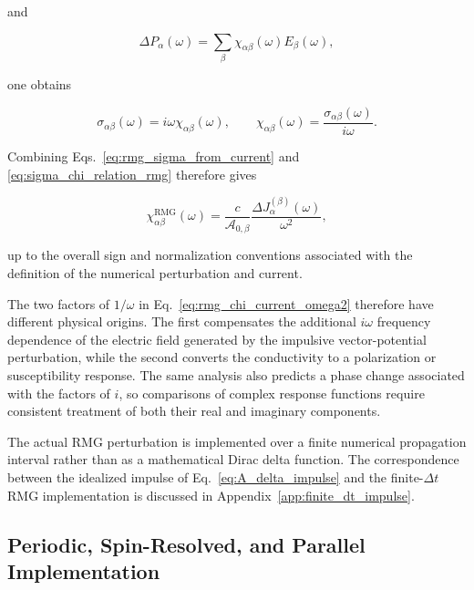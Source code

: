 and

\begin{equation}
\Delta P_{\alpha}(\omega)
=
\sum_{\beta}
\chi_{\alpha\beta}(\omega)
E_{\beta}(\omega),
\end{equation}

one obtains

\begin{equation}
\sigma_{\alpha\beta}(\omega)
=
i\omega
\chi_{\alpha\beta}(\omega),
\qquad
\chi_{\alpha\beta}(\omega)
=
\frac{\sigma_{\alpha\beta}(\omega)}
     {i\omega}.
\label{eq:sigma_chi_relation_rmg}
\end{equation}

Combining Eqs.~\eqref{eq:rmg_sigma_from_current} and
\eqref{eq:sigma_chi_relation_rmg} therefore gives

\begin{equation}
\chi_{\alpha\beta}^{\mathrm{RMG}}(\omega)
=
\frac{c}
     {\mathcal{A}_{0,\beta}}
\frac{\Delta J_{\alpha}^{(\beta)}(\omega)}
     {\omega^{2}},
\label{eq:rmg_chi_current_omega2}
\end{equation}

up to the overall sign and normalization conventions associated with
the definition of the numerical perturbation and current.

The two factors of $1/\omega$ in
Eq.~\eqref{eq:rmg_chi_current_omega2} therefore have different physical
origins.  The first compensates the additional $i\omega$ frequency
dependence of the electric field generated by the impulsive
vector-potential perturbation, while the second converts the
conductivity to a polarization or susceptibility response.  The same
analysis also predicts a phase change associated with the factors of
$i$, so comparisons of complex response functions require consistent
treatment of both their real and imaginary components.

The actual RMG perturbation is implemented over a finite numerical
propagation interval rather than as a mathematical Dirac delta
function.  The correspondence between the idealized impulse of
Eq.~\eqref{eq:A_delta_impulse} and the finite-$\Delta t$ RMG
implementation is discussed in Appendix~\ref{app:finite_dt_impulse}.

\subsection{Periodic, Spin-Resolved, and Parallel Implementation}
\label{sec:implementation-periodic-spin-parallel}

